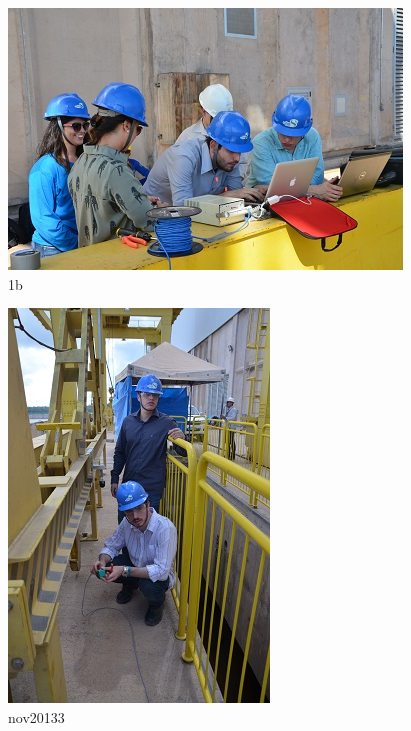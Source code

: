 \begin{figure}[h!]
  \centering
  \includegraphics[width=1\linewidth]{Fotos/JirauJunho2014/7.jpg}
  \caption{1b}
  \label{nov20132}
\end{figure}

\begin{figure}[h!]
  \centering
  \includegraphics[width=1\linewidth]{Fotos/JirauJunho2014/8.jpg}
  \caption{nov20133}
  \label{nov20133}
\end{figure}

